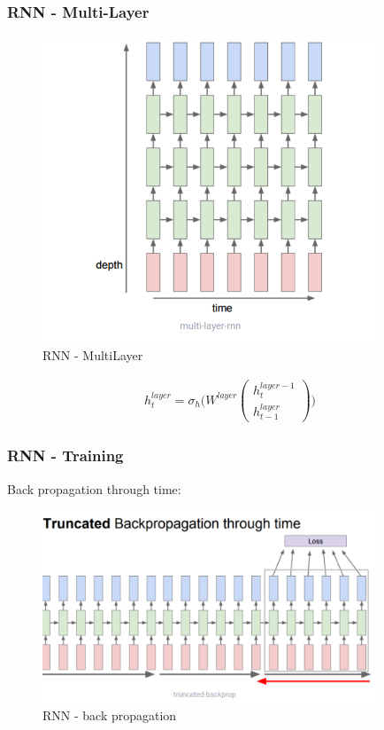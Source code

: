 \documentclass[12pt]{report}
\begin{document}
\subsubsection{RNN - Multi-Layer}
\begin{figure}[H]\centering\includegraphics[width=10cm]{RNN_MULTI.png}\caption{RNN - MultiLayer}\end{figure}
\begin{align*}
	h_t^{layer} = \sigma_h \bigg(W^{layer} \begin{pmatrix}
		h_{t}^{layer-1} \\ h_{t-1}^{layer}
	\end{pmatrix} \bigg)
\end{align*}


\subsubsection{RNN - Training }
Back propagation through time:
\begin{figure}[H]\centering\includegraphics[width=10cm]{RNN_BACKPROP.png}\caption{RNN - back propagation}\end{figure}
\end{document}
